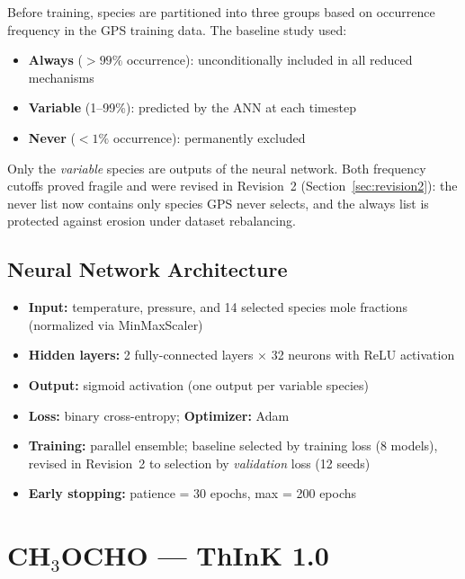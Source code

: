 \documentclass[11pt,a4paper]{article}
\begin{document}
Before training, species are partitioned into three groups based on occurrence frequency in the GPS training data. The baseline study used:
\begin{itemize}
    \item \textbf{Always} ($>99\%$ occurrence): unconditionally included in all reduced mechanisms
    \item \textbf{Variable} (1--99\%): predicted by the ANN at each timestep
    \item \textbf{Never} ($<1\%$ occurrence): permanently excluded
\end{itemize}
Only the \emph{variable} species are outputs of the neural network. Both
frequency cutoffs proved fragile and were revised in Revision~2
(Section~\ref{sec:revision2}): the never list now contains only species GPS
never selects, and the always list is protected against erosion under dataset
rebalancing.

\subsection{Neural Network Architecture}

\begin{itemize}
    \item \textbf{Input:} temperature, pressure, and 14 selected species mole fractions (normalized via MinMaxScaler)
    \item \textbf{Hidden layers:} 2 fully-connected layers $\times$ 32 neurons with ReLU activation
    \item \textbf{Output:} sigmoid activation (one output per variable species)
    \item \textbf{Loss:} binary cross-entropy; \textbf{Optimizer:} Adam
    \item \textbf{Training:} parallel ensemble; baseline selected by training loss (8 models), revised in Revision~2 to selection by \emph{validation} loss (12 seeds)
    \item \textbf{Early stopping:} patience = 30 epochs, max = 200 epochs
\end{itemize}

\newpage
\section{CH\texorpdfstring{$_3$}{3}OCHO --- ThInK 1.0}
\label{sec:ch3ocho}
\end{document}

